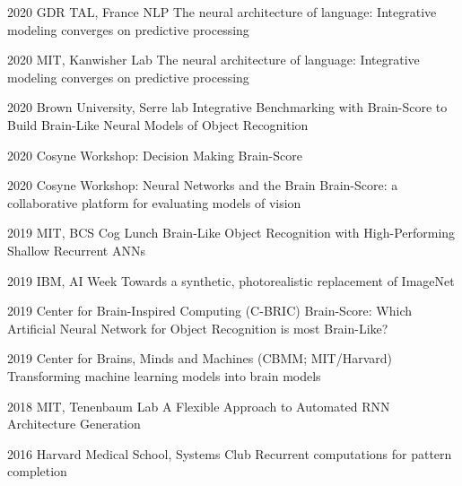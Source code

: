 {\presentation%
{%
2020  %
}{%
GDR TAL, France NLP  %
}{%
The neural architecture of language: Integrative modeling converges on predictive processing
}

\presentation%
{%
2020  %
}{%
MIT, Kanwisher Lab
}{%
The neural architecture of language: Integrative modeling converges on predictive processing
}

\presentation%
{%
2020  %
}{%
Brown University, Serre lab
}{%
Integrative Benchmarking with Brain-Score to Build Brain-Like Neural Models of Object Recognition
}

\presentation%
{%
2020  %
}{%
Cosyne Workshop: Decision Making
}{%
Brain-Score
}

\presentation%
{%
2020  %
}{%
Cosyne Workshop: Neural Networks and the Brain %
}{%
Brain-Score: a collaborative platform for evaluating models of vision
}

\presentation%
{%
2019  %
}{%
MIT, BCS Cog Lunch
}{%
Brain-Like Object Recognition with High-Performing Shallow Recurrent ANNs
}

\presentation%
{%
2019  %
}{%
IBM, AI Week%
}{%
Towards a synthetic, photorealistic replacement of ImageNet
}

\presentation%
{%
2019  %
}{%
Center for Brain-Inspired Computing (C-BRIC)
}{%
Brain-Score: Which Artificial Neural Network for Object Recognition is most Brain-Like?
}

\presentation%
{%
2019  %
}{%
Center for Brains, Minds and Machines (CBMM; MIT/Harvard)
}{%
Transforming machine learning models into brain models
}

\presentation%
{%
2018  %
}{%
MIT, Tenenbaum Lab
}{%
A Flexible Approach to Automated RNN Architecture Generation
}

\presentation%
{%
2016  %
}{%
Harvard Medical School, Systems Club
}{%
Recurrent computations for pattern completion
}
}


